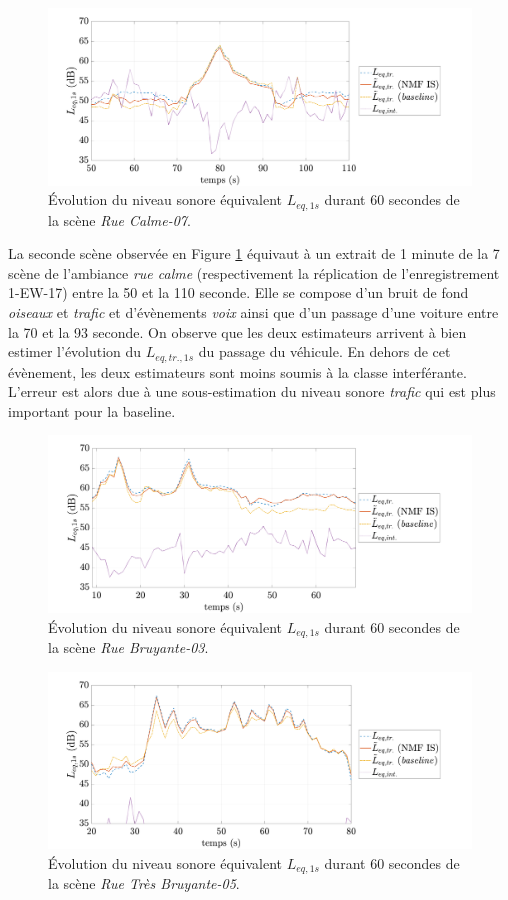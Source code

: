 \begin{figure}[h!]
\centering
\includegraphics[width=.8\linewidth]{./figures/NMF/Lp_quietStreet_7.pdf} 
\caption{Évolution du niveau sonore équivalent $L_{eq, 1s}$ durant 60 secondes de la scène \textit{Rue Calme-07}.} 
\label{fig:Lp_quiet}
\end{figure}

La seconde scène observée en Figure \ref{fig:Lp_quiet} équivaut à un extrait de 1 minute de la 7\ieme{} scène de l'ambiance \textit{rue calme} (respectivement la réplication de  l'enregistrement 1-EW-17) entre la 50\ieme{} et la 110\ieme{} seconde. Elle se compose d'un bruit de fond \textit{oiseaux} et \textit{trafic} et d'évènements \textit{voix} ainsi que d'un passage d'une voiture entre la 70\ieme{} et la 93\ieme{} seconde. On observe que les deux estimateurs arrivent à bien estimer l'évolution du $L_{eq,tr.,1s}$ du passage du véhicule. En dehors de cet évènement, les deux estimateurs sont moins soumis à la classe interférante. L'erreur est alors due à une sous-estimation du niveau sonore \textit{trafic} qui est plus important pour la baseline.


\begin{figure}[h!]
\centering
\includegraphics[width=.8\linewidth]{./figures/NMF/Lp_noisyStreet_3.pdf} 
\caption{Évolution du niveau sonore équivalent $L_{eq, 1s}$ durant 60 secondes de la scène \textit{Rue Bruyante-03}.} 
\label{fig:Lp_noisy}
\end{figure}

\begin{figure}[h!]
\centering
\includegraphics[width=.8\linewidth]{./figures/NMF/Lp_veryNoisyStreet_5.pdf} 
\caption{Évolution du niveau sonore équivalent $L_{eq, 1s}$ durant 60 secondes de la scène \textit{Rue Très Bruyante-05}.} 
\label{fig:Lp_veryNoisy}
\end{figure}


